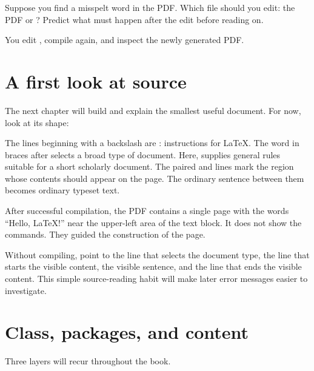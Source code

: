 \begin{pausepredict}
Suppose you find a misspelt word in the PDF. Which file should you edit: the
PDF or ? Predict what must happen after the edit before reading
on.

You edit , compile again, and inspect the newly generated PDF.
\end{pausepredict}

\section{A first look at source}

The next chapter will build and explain the smallest useful document. For now,
look at its shape:


The lines beginning with a backslash are : instructions for
\LaTeX{}. The word in braces after  selects a broad type of
document. Here,  supplies general rules suitable for a short
scholarly document. The paired  and
 lines mark the region whose contents should
appear on the page. The ordinary sentence between them becomes ordinary
typeset text.

\expectedoutput

After successful compilation, the PDF contains a single page with the words
``Hello, \LaTeX{}!'' near the upper-left area of the text block. It does not show
the commands. They guided the construction of the page.

\begin{tryit}
Without compiling, point to the line that selects the document type, the line
that starts the visible content, the visible sentence, and the line that ends
the visible content. This simple source-reading habit will make later error
messages easier to investigate.
\end{tryit}

\section{Class, packages, and content}

Three layers will recur throughout the book.

